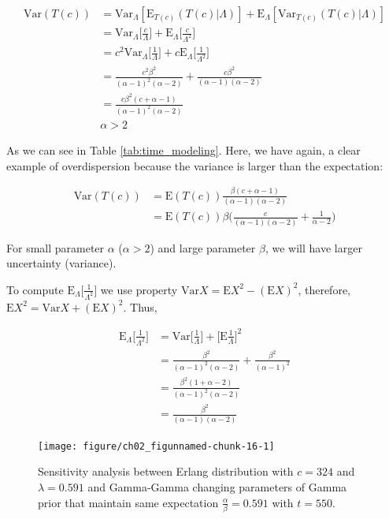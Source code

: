 \begin{align*}
\textrm{Var}(T(c)) &= \textrm{Var}_{\Lambda}[\textrm{E}_{T(c)} (T(c)|\Lambda)] + \textrm{E}_{\Lambda}[\textrm{Var}_{T(c)}(T(c)|\Lambda)]\\
&=\textrm{Var}_{\Lambda}\Bigg [\frac{c}{\Lambda}\Bigg ] + \textrm{E}_{\Lambda}\Bigg [\frac{c}{\Lambda^2}\Bigg ] \\
&=c^2\textrm{Var}_{\Lambda}\Bigg [\frac{1}{\Lambda}\Bigg ] + c\textrm{E}_{\Lambda}\Bigg [\frac{1}{\Lambda^2}\Bigg ] \\
&=\frac{c^2\beta^2}{(\alpha-1)^2(\alpha-2)} + \frac{c\beta^2}{(\alpha-1)(\alpha-2)}\\
&=\frac{c\beta^2(c+\alpha-1)}{(\alpha-1)^2(\alpha-2)}\\
&\alpha>2
\end{align*}

As we can see in Table \ref{tab:time_modeling}. Here, we have again, a clear example of overdispersion because the variance is larger than the expectation:

\begin{align*}
\textrm{Var}(T(c))&=\textrm{E}(T(c))\frac{\beta(c+\alpha-1)}{(\alpha-1)(\alpha-2)}\\
&=\textrm{E}(T(c))\beta\Bigg(\frac{c}{(\alpha-1)(\alpha-2)}+\frac{1}{\alpha-2}\Bigg)
\end{align*}

For small parameter $\alpha$ ($\alpha>2$) and large parameter $\beta$, we will have larger uncertainty (variance).

To compute $\textrm{E}_{\Lambda}\Bigg [\frac{1}{\Lambda^2}\Bigg ]$ we use property $\textrm{Var}X = \textrm{E}X^2-(\textrm{E}X)^2$, therefore, $\textrm{E}X^2 = \textrm{Var}X + (\textrm{E}X)^2$. Thus,

\begin{align*}
\textrm{E}_{\Lambda}\Bigg [\frac{1}{\Lambda^2}\Bigg ] &= \textrm{Var}\Bigg [\frac{1}{\Lambda}\Bigg ] + \Bigg [\textrm{E}\frac{1}{\Lambda}\Bigg ]^2\\
&=\frac{\beta^2}{(\alpha-1)^2(\alpha-2)} + \frac{\beta^2}{(\alpha-1)^2}\\
&=\frac{\beta^2(1+\alpha-2)}{(\alpha-1)^2(\alpha-2)}\\
&=\frac{\beta^2}{(\alpha-1)(\alpha-2)}
\end{align*}

\begin{figure}
\begin{knitrout}
\color{fgcolor}

{\centering \texttt{[image: figure/ch02\_figunnamed-chunk-16-1]} 

}


\end{knitrout}
	\caption{Sensitivity analysis between Erlang distribution with $c = 324$ and $\lambda = 0.591$ and Gamma-Gamma changing parameters of Gamma prior that maintain same expectation $\frac{\alpha}{\beta} = 0.591$ with $t=550$.}
  \label{fig:2_6a}
\end{figure}



